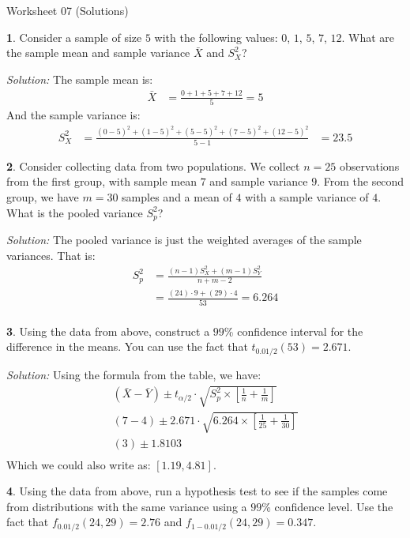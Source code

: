 \documentclass{tufte-handout}
\begin{document}
\justify

{\LARGE Worksheet 07 (Solutions)}

\vspace*{18pt}


\textbf{1}. Consider a sample of size $5$ with the following values: $0$, $1$, $5$, $7$, $12$.
What are the sample mean and sample variance $\bar{X}$ and $S^2_X$?


\textit{Solution:} The sample mean is:
\begin{align*}
\bar{X} &= \frac{0 + 1 + 5 + 7 + 12}{5} = 5
\end{align*}
And the sample variance is:
\begin{align*}
S^2_X &= \frac{(0-5)^2 + (1-5)^2 + (5-5)^2 + (7-5)^2 + (12-5)^2}{5 - 1} &= 23.5
\end{align*}

\textbf{2}. Consider collecting data from two populations. We collect $n=25$ observations
from the first group, with sample mean $7$ and sample variance $9$. From the 
second group, we have $m=30$ samples and a mean of $4$ with a sample variance
of $4$. What is the pooled variance $S^2_p$?

\textit{Solution:} The pooled variance is just the weighted averages of the sample variances.
That is:
\begin{align*}
S_p^2 &= \frac{(n-1) S_X^2 + (m-1) S_Y^2}{n + m - 2} \\
&= \frac{(24) \cdot 9 + (29) \cdot 4}{53} = 6.264 \\
\end{align*}

\textbf{3}. Using the data from above, construct a $99$\% confidence interval for the 
difference in the means. You can use the fact that $t_{0.01/2}(53) = 2.671$. 


\textit{Solution:} Using the formula from the table, we have:
\begin{align*}
(\bar{X} - \bar{Y}) \pm t_{\alpha/2} \cdot \sqrt{S_p^2 \times \left[\frac{1}{n} + \frac{1}{m}\right]} \\
(7-4) \pm 2.671 \cdot \sqrt{6.264 \times \left[\frac{1}{25} + \frac{1}{30}\right]} \\
(3) \pm 1.8103 \\
\end{align*}
Which we could also write as: $[1.19, 4.81]$.

\textbf{4}. Using the data from above, run a hypothesis test to see if the samples come from
distributions with the same variance using a $99$\% confidence level. Use the fact
that $f_{0.01/2}(24, 29) = 2.76$ and $f_{1-0.01/2}(24, 29) = 0.347$. 
\end{document}
